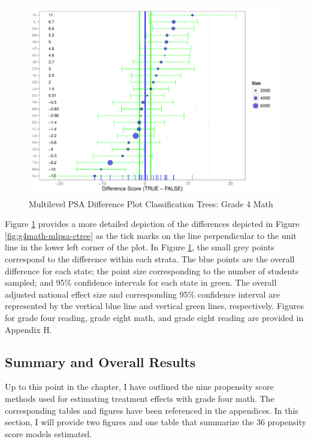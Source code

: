\documentclass[letterpaper,12p,twoside]{article} %
\begin{document}
\begin{figure}[t]
\begin{center}
\includegraphics[width=\textwidth]{../Figures2009/g4math-mlpsa-ctree-diff.pdf}
\caption{Multilevel PSA Difference Plot Classification Trees: Grade 4 Math}
\label{fig:g4math-mlpsa-ctree-diff}
\end{center}
\end{figure}

Figure \ref{fig:g4math-mlpsa-ctree-diff} provides a more detailed depiction of the differences depicted in Figure \ref{fig:g4math-mlpsa-ctree} as the tick marks on the line perpendicular to the unit line in the lower left corner of the plot. In Figure \ref{fig:g4math-mlpsa-ctree-diff}, the small grey points correspond to the difference within each strata. The blue points are the overall difference for each state; the point size corresponding to the number of students sampled; and 95\% confidence intervals for each state in green. The overall adjusted national effect size and corresponding 95\% confidence interval are represented by the vertical blue line and vertical green lines, respectively. Figures for grade four reading, grade eight math, and grade eight reading are provided in Appendix H.

\clearpage
\subsection{Summary and Overall Results}

Up to this point in the chapter, I have outlined the nine propensity score methods used for estimating treatment effects with grade four math. The corresponding tables and figures have been referenced in the appendices. In this section, I will provide two figures and one table that summarize the 36 propensity score models estimated.
\end{document}
